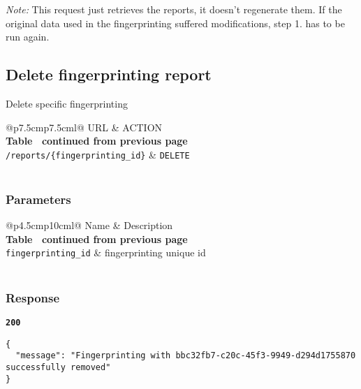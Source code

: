 \textit{Note:} This request just retrieves the reports, it doesn't regenerate them. 
If the original data used in the fingerprinting suffered modifications, step 1. has to be run again.

\subsection{Delete fingerprinting report}
Delete specific fingerprinting

\begin{longtable}[c]{@{}p{7.5cm}p{7.5cm}l@{}}
  \toprule
  URL                                      & ACTION           \\* \midrule
  \endfirsthead
  \multicolumn{3}{c}%
  {{\bfseries Table \thetable\ continued from previous page}} \\
  \endhead
  \bottomrule
  \endfoot
  \endlastfoot
  \texttt{/reports/\{fingerprinting\_id\}} & \texttt{DELETE}  \\* \bottomrule
  \label{tab:rdf-fingerprinting-delete-fingerprinter}                 \\
\end{longtable}

\subsubsection{Parameters}
\begin{longtable}[c]{@{}p{4.5cm}p{10cm}l@{}}
  \toprule
  Name                    & Description                       \\* \midrule
  \endfirsthead
  \multicolumn{3}{c}%
  {{\bfseries Table \thetable\ continued from previous page}} \\
  \endhead
  \bottomrule
  \endfoot
  \endlastfoot
  \texttt{fingerprinting\_id} & fingerprinting unique id              \\* \bottomrule
  \label{tab:rdf-fingerprinter-delete-fingerprinting-parameters}      \\
\end{longtable}

\subsubsection{Response}
\textbf{\texttt{200}}
\begin{lstlisting}
{
  "message": "Fingerprinting with bbc32fb7-c20c-45f3-9949-d294d1755870 successfully removed"
}
\end{lstlisting}

